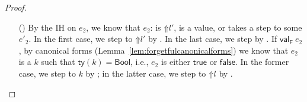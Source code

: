 \documentclass[9pt]{extarticle}
\newcommand{\ottnt}[1]{\mathit{#1}}
\newcommand{\ottsym}[1]{#1}
\begin{document}
{\begin{lemma}
\begin{proof}
{\begin{itemize}
    \item[(\T{Check})] By the IH on $\ottnt{e_{{\mathrm{2}}}}$, we know that $\ottnt{e_{{\mathrm{2}}}}$:
      is $ \mathord{\Uparrow}  \ottnt{l'} $, is a value, or takes a step to some
      $\ottnt{e'_{{\mathrm{2}}}}$. In the first case, we step to $ \mathord{\Uparrow}  \ottnt{l'} $ by
      . In the last case, we step by . If
      $ \mathsf{val} _{  \mathsf{F}  }~ \ottnt{e_{{\mathrm{2}}}} $, by canonical forms
      (Lemma~\ref{lem:forgetfulcanonicalforms}) we know that $\ottnt{e_{{\mathrm{2}}}}$
      is a $\ottnt{k}$ such that $ \mathsf{ty} ( \ottnt{k} )   \ottsym{=}   \mathsf{Bool} $, i.e., $\ottnt{e_{{\mathrm{2}}}}$ is
      either $ \mathsf{true} $ or $ \mathsf{false} $. In the former case, we step to
      $\ottnt{k}$ by ; in the latter case, we step to
      $ \mathord{\Uparrow}  \ottnt{l} $ by .

    \end{itemize}  
    \fi}
  \end{proof}  
\end{lemma}

}
\end{document}

